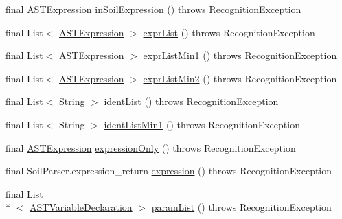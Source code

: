 \begin{DoxyCompactItemize}
final \hyperlink{classorg_1_1tzi_1_1use_1_1parser_1_1ocl_1_1_a_s_t_expression}{A\-S\-T\-Expression} \hyperlink{classorg_1_1tzi_1_1use_1_1parser_1_1soil_1_1_soil_parser_a6f17befff2a46f7a1a24fe261cf0ff63}{in\-Soil\-Expression} ()  throws Recognition\-Exception 
\item 
final List$<$ \hyperlink{classorg_1_1tzi_1_1use_1_1parser_1_1ocl_1_1_a_s_t_expression}{A\-S\-T\-Expression} $>$ \hyperlink{classorg_1_1tzi_1_1use_1_1parser_1_1soil_1_1_soil_parser_aa7a09c5ff27cca087b4822b71935aee0}{expr\-List} ()  throws Recognition\-Exception 
\item 
final List$<$ \hyperlink{classorg_1_1tzi_1_1use_1_1parser_1_1ocl_1_1_a_s_t_expression}{A\-S\-T\-Expression} $>$ \hyperlink{classorg_1_1tzi_1_1use_1_1parser_1_1soil_1_1_soil_parser_a938196166379923ca2ec6a9d05eb5882}{expr\-List\-Min1} ()  throws Recognition\-Exception 
\item 
final List$<$ \hyperlink{classorg_1_1tzi_1_1use_1_1parser_1_1ocl_1_1_a_s_t_expression}{A\-S\-T\-Expression} $>$ \hyperlink{classorg_1_1tzi_1_1use_1_1parser_1_1soil_1_1_soil_parser_adaa8108544605d68cdc068ebc0378167}{expr\-List\-Min2} ()  throws Recognition\-Exception 
\item 
final List$<$ String $>$ \hyperlink{classorg_1_1tzi_1_1use_1_1parser_1_1soil_1_1_soil_parser_a8e112b507d1325866a926b30a4512e67}{ident\-List} ()  throws Recognition\-Exception 
\item 
final List$<$ String $>$ \hyperlink{classorg_1_1tzi_1_1use_1_1parser_1_1soil_1_1_soil_parser_aa44140755340554ad458f5041721ddf1}{ident\-List\-Min1} ()  throws Recognition\-Exception 
\item 
final \hyperlink{classorg_1_1tzi_1_1use_1_1parser_1_1ocl_1_1_a_s_t_expression}{A\-S\-T\-Expression} \hyperlink{classorg_1_1tzi_1_1use_1_1parser_1_1soil_1_1_soil_parser_a2d08d2f9a237fca778b74550c2496b8a}{expression\-Only} ()  throws Recognition\-Exception 
\item 
final Soil\-Parser.\-expression\-\_\-return \hyperlink{classorg_1_1tzi_1_1use_1_1parser_1_1soil_1_1_soil_parser_a796d6cbdbe021cffa5ae81a8b763d63b}{expression} ()  throws Recognition\-Exception 
\item 
final List\\*
$<$ \hyperlink{classorg_1_1tzi_1_1use_1_1parser_1_1ocl_1_1_a_s_t_variable_declaration}{A\-S\-T\-Variable\-Declaration} $>$ \hyperlink{classorg_1_1tzi_1_1use_1_1parser_1_1soil_1_1_soil_parser_a371b7732c1b4a22668082497036c2863}{param\-List} ()  throws Recognition\-Exception 
\item 

\end{DoxyCompactItemize}
